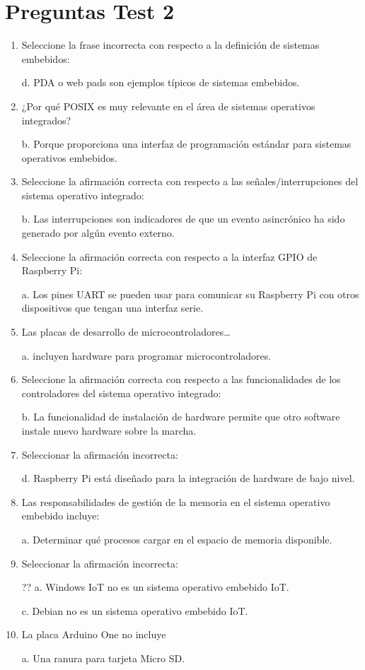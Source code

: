 \documentclass[12pt, twoside, openright]{report} %
\begin{document}
\section{Preguntas Test 2}
\begin{enumerate}
	\item Seleccione la frase incorrecta con respecto a la definición de sistemas embebidos:

	      d. PDA o web pads son ejemplos típicos de sistemas embebidos.

	\item ¿Por qué POSIX es muy relevante en el área de sistemas operativos integrados?

	      b. Porque proporciona una interfaz de programación estándar para sistemas operativos embebidos.

	\item Seleccione la afirmación correcta con respecto a las señales/interrupciones del sistema operativo integrado:

	      b. Las interrupciones son indicadores de que un evento asincrónico ha sido generado por algún evento externo.

	\item Seleccione la afirmación correcta con respecto a la interfaz GPIO de Raspberry Pi:

	      a. Los pines UART se pueden usar para comunicar su Raspberry Pi con otros dispositivos que tengan una interfaz serie.

	\item Las placas de desarrollo de microcontroladores…

	      a. incluyen hardware para programar microcontroladores.

	\item Seleccione la afirmación correcta con respecto a las funcionalidades de los controladores del sistema operativo integrado:

	      b. La funcionalidad de instalación de hardware permite que otro software instale nuevo hardware sobre la marcha.

	\item Seleccionar la afirmación incorrecta:

	      d. Raspberry Pi está diseñado para la integración de hardware de bajo nivel.

	\item Las responsabilidades de gestión de la memoria en el sistema operativo embebido incluye:

	      a. Determinar qué procesos cargar en el espacio de memoria disponible.

	\item Seleccionar la afirmación incorrecta:

	      ?? a. Windows IoT no es un sistema operativo embebido IoT.

	      c. Debian no es un sistema operativo embebido IoT.

	\item La placa Arduino One no incluye

	      a. Una ranura para tarjeta Micro SD.
\end{enumerate}
\end{document}
